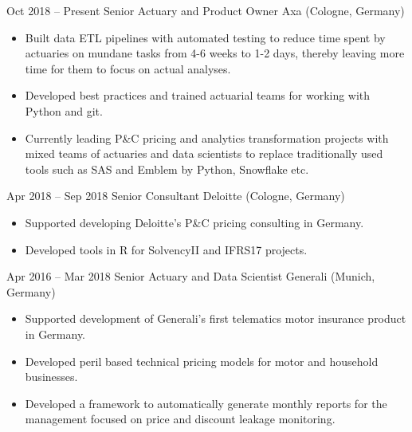 \documentclass[
	a4paper,
]{fortysecondscv}
\begin{document}
\makefrontsidebar


	\begin{cvtable}[2.5]
		\cvitem
			{Oct 2018 -- Present}
			{Senior Actuary and Product Owner}
			{Axa (Cologne, Germany)}
			{				
				\vspace{-\topsep}
				\begin{itemize}[nosep, leftmargin=0pt] %
  					\item Built data ETL pipelines with automated testing to reduce  time spent by actuaries on mundane tasks from 4-6 weeks to 1-2 days, thereby leaving more time for them to focus on actual analyses.
  					\item Developed best practices and trained actuarial teams for working with Python and git.
  					\item Currently leading P\&C pricing and analytics transformation projects with mixed teams of actuaries and data scientists to replace traditionally used tools such as SAS and Emblem by Python, Snowflake etc.
				\end{itemize}
			}
		\cvitem
			{Apr 2018 -- Sep 2018}
			{Senior Consultant}
			{Deloitte (Cologne, Germany)}
			{				
				\vspace{-\topsep}
				\begin{itemize}[nosep, leftmargin=0pt] %
  					\item Supported developing Deloitte's P\&C pricing consulting in Germany.
  					\item Developed tools in R for SolvencyII and IFRS17 projects.
				\end{itemize}
			}
		\cvitem
			{Apr 2016 -- Mar 2018}
			{Senior Actuary and Data Scientist}
			{Generali (Munich, Germany)}
			{				
				\vspace{-\topsep}
				\begin{itemize}[nosep, leftmargin=0pt] %
					\item Supported development of Generali’s first telematics motor insurance product in Germany.
					\item Developed peril based technical pricing models for motor and household businesses.
					\item Developed a framework to automatically generate monthly reports for the management focused on price and discount leakage monitoring.

\end{itemize}}
\end{cvtable}
\end{document}
